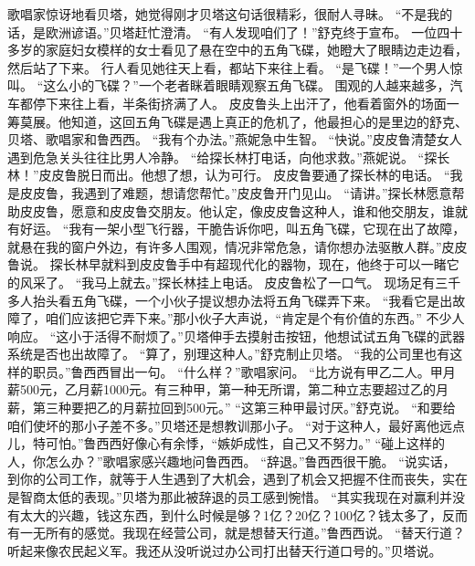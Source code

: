 \documentclass[a4paper,12pt,UTF8,twoside]{ctexbook}
\begin{document}
        歌唱家惊讶地看贝塔，她觉得刚才贝塔这句话很精彩，很耐人寻昧。  
        “不是我的话，是欧洲谚语。”贝塔赶忙澄清。  
        “有人发现咱们了！”舒克终于宣布。  
        一位四十多岁的家庭妇女模样的女士看见了悬在空中的五角飞碟，她瞪大了眼睛边走边看，然后站了下来。  
        行人看见她往天上看，都站下来往上看。  
        “是飞碟！”一个男人惊叫。        
        “这么小的飞碟？”一个老者眯着眼睛观察五角飞碟。  
        围观的人越来越多，汽车都停下来往上看，半条街挤满了人。  
        皮皮鲁头上出汗了，他看着窗外的场面一筹莫展。他知道，这回五角飞碟是遇上真正的危机了，他最担心的是里边的舒克、贝塔、歌唱家和鲁西西。  
        “我有个办法。”燕妮急中生智。  
        “快说。”皮皮鲁清楚女人遇到危急关头往往比男人冷静。  
        “给探长林打电话，向他求救。”燕妮说。  
        “探长林！”皮皮鲁脱日而出。他想了想，认为可行。  
        皮皮鲁要通了探长林的电话。  
        “我是皮皮鲁，我遇到了难题，想请您帮忙。”皮皮鲁开门见山。  
        “请讲。”探长林愿意帮助皮皮鲁，愿意和皮皮鲁交朋友。他认定，像皮皮鲁这种人，谁和他交朋友，谁就有好运。  
        “我有一架小型飞行器，干脆告诉你吧，叫五角飞碟，它现在出了故障，就悬在我的窗户外边，有许多人围观，情况非常危急，请你想办法驱散人群。”皮皮鲁说。  
        探长林早就料到皮皮鲁手中有超现代化的器物，现在，他终于可以一睹它的风采了。  
        “我马上就去。”探长林挂上电话。  
        皮皮鲁松了一口气。  
        现场足有三千多人抬头看五角飞碟，一个小伙子提议想办法将五角飞碟弄下来。  
        “我看它是出故障了，咱们应该把它弄下来。”那小伙子大声说，“肯定是个有价值的东西。”  
        不少人响应。  
        “这小于活得不耐烦了。”贝塔伸手去摸射击按钮，他想试试五角飞碟的武器系统是否也出故障了。  
        “算了，别理这种人。”舒克制止贝塔。  
        “我的公司里也有这样的职员。”鲁西西冒出一句。  
        “什么样？”歌唱家问。  
        “比方说有甲乙二人。甲月薪500元，乙月薪1000元。有三种甲，第一种无所谓，第二种立志要超过乙的月薪，第三种要把乙的月薪拉回到500元。”  
        “这第三种甲最讨厌。”舒克说。  
        “和要给咱们使坏的那小子差不多。”贝塔还是想教训那小子。  
        “对于这种人，最好离他远点儿，特可怕。”鲁西西好像心有余悸，“嫉妒成性，自己又不努力。”  
        “碰上这样的人，你怎么办？”歌唱家感兴趣地问鲁西西。        
        “辞退。”鲁西西很干脆。  
        “说实话，到你的公司工作，就等于人生遇到了大机会，遇到了机会又把握不住而丧失，实在是智商太低的表现。”贝塔为那此被辞退的员工感到惋惜。  
        “其实我现在对赢利并没有太大的兴趣，钱这东西，到什么时候是够？1亿？20亿？100亿？钱太多了，反而有一无所有的感觉。我现在经营公司，就是想替天行道。”鲁西西说。  
        “替天行道？听起来像农民起义军。我还从没听说过办公司打出替天行道口号的。”贝塔说。  
\end{document}
